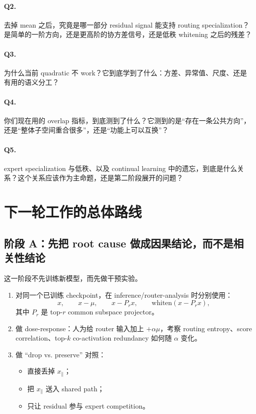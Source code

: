 \documentclass[11pt]{article}
\begin{document}
\paragraph{Q2.} 去掉 mean 之后，究竟是哪一部分 residual signal 能支持 routing specialization？是简单的一阶方向，还是更高阶的协方差信号，还是低秩 whitening 之后的残差？

\paragraph{Q3.} 为什么当前 quadratic 不 work？它到底学到了什么：方差、异常值、尺度、还是有用的语义分工？

\paragraph{Q4.} 你们现在用的 overlap 指标，到底测到了什么？它测到的是“存在一条公共方向”，还是“整体子空间重合很多”，还是“功能上可以互换”？

\paragraph{Q5.} expert specialization 与低秩、以及 continual learning 中的遗忘，到底是什么关系？这个关系应该作为主命题，还是第二阶段展开的问题？

\section{下一轮工作的总体路线}

\subsection{阶段 A：先把 root cause 做成因果结论，而不是相关性结论}
这一阶段不先训练新模型，而先做干预实验。
\begin{enumerate}
    \item 对同一个已训练 checkpoint，在 inference/router-analysis 时分别使用：
    \[
        x,\qquad x-\mu,\qquad x-P_r x,\qquad \mathrm{whiten}(x-P_r x),
    \]
    其中 $P_r$ 是 top-$r$ common subspace projector。
    \item 做 dose-response：人为给 router 输入加上 $+\alpha\mu$，考察 routing entropy、score correlation、top-$k$ co-activation redundancy 如何随 $\alpha$ 变化。
    \item 做 ``drop vs. preserve'' 对照：
    \begin{itemize}
        \item 直接丢掉 $x_{\parallel}$；
        \item 把 $x_{\parallel}$ 送入 shared path；
        \item 只让 residual 参与 expert competition。
    \end{itemize}
\end{enumerate}
\end{document}
